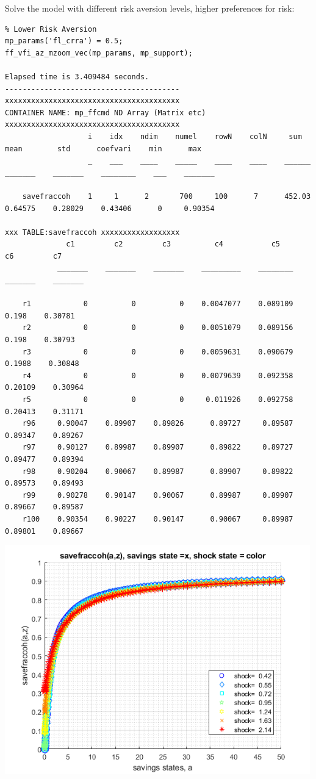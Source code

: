 \documentclass[
]{book}
\begin{document}
Solve the model with different risk aversion levels, higher preferences
for risk:

\begin{verbatim}
% Lower Risk Aversion
mp_params('fl_crra') = 0.5;
ff_vfi_az_mzoom_vec(mp_params, mp_support);

Elapsed time is 3.409484 seconds.
----------------------------------------
xxxxxxxxxxxxxxxxxxxxxxxxxxxxxxxxxxxxxxxx
CONTAINER NAME: mp_ffcmd ND Array (Matrix etc)
xxxxxxxxxxxxxxxxxxxxxxxxxxxxxxxxxxxxxxxx
                   i    idx    ndim    numel    rowN    colN     sum       mean        std      coefvari    min      max  
                   _    ___    ____    _____    ____    ____    ______    _______    _______    ________    ___    _______

    savefraccoh    1     1      2       700     100      7      452.03    0.64575    0.28029    0.43406      0     0.90354

xxx TABLE:savefraccoh xxxxxxxxxxxxxxxxxx
              c1         c2         c3          c4           c5         c6         c7   
            _______    _______    _______    _________    ________    _______    _______

    r1            0          0          0    0.0047077    0.089109      0.198    0.30781
    r2            0          0          0    0.0051079    0.089156      0.198    0.30793
    r3            0          0          0    0.0059631    0.090679     0.1988    0.30848
    r4            0          0          0    0.0079639    0.092358    0.20109    0.30964
    r5            0          0          0     0.011926    0.092758    0.20413    0.31171
    r96     0.90047    0.89907    0.89826      0.89727     0.89587    0.89347    0.89267
    r97     0.90127    0.89987    0.89907      0.89822     0.89727    0.89477    0.89394
    r98     0.90204    0.90067    0.89987      0.89907     0.89822    0.89573    0.89493
    r99     0.90278    0.90147    0.90067      0.89987     0.89907    0.89667    0.89587
    r100    0.90354    0.90227    0.90147      0.90067     0.89987    0.89801    0.89667
\end{verbatim}

\includegraphics[width=5.20833in,height=\textheight]{img/fx_vfi_az_mzoom_vec_images/figure_4.png}
\end{document}
